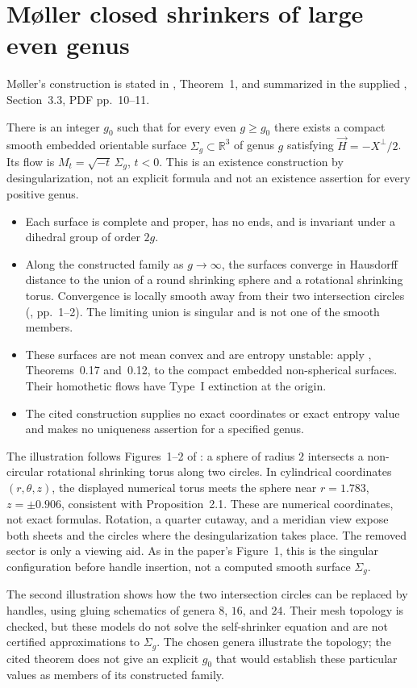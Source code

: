 \chapter{Møller closed shrinkers of large even genus}\label{sec:catalogue-moller-genus}
M{\o}ller's construction is stated in \cite{CatMoller2014}, Theorem~1,
and summarized in the supplied \cite{CatDLN2018}, Section~3.3,
PDF pp.~10--11.

\begin{example}\label{ex:catalogue-moller-genus}
There is an integer $g_0$ such that for every even $g\geq g_0$ there
exists a compact smooth embedded orientable surface
$\Sigma_g\subset\mathbb R^3$ of genus $g$ satisfying
$\vec H=-X^\perp/2$. Its flow is
$M_t=\sqrt{-t}\,\Sigma_g$, $t<0$.
This is an existence construction by desingularization, not an explicit
formula and not an existence assertion for every positive genus.
\begin{itemize}
\item Each surface is complete and proper, has no ends, and is invariant
under a dihedral group of order $2g$.
\item Along the constructed family as $g\to\infty$, the surfaces
converge in Hausdorff distance to the union of a round shrinking sphere
and a rotational shrinking torus. Convergence is locally smooth away
from their two intersection circles (\cite{CatMoller2014}, pp.~1--2).
The limiting union is singular and is not one of the smooth members.
\item These surfaces are not mean convex and are entropy unstable:
apply \cite{CM12}, Theorems~0.17 and~0.12, to the compact
embedded non-spherical surfaces. Their homothetic flows have Type~I
extinction at the origin.
\item The cited construction supplies no exact coordinates or exact
entropy value and makes no uniqueness assertion for a specified genus.
\end{itemize}
The illustration follows Figures~1--2 of \cite{CatMoller2014}: a sphere
of radius $2$ intersects a non-circular rotational shrinking torus along
two circles. In cylindrical coordinates $(r,\theta,z)$, the displayed
numerical torus meets the sphere near $r=1.783$, $z=\pm0.906$,
consistent with Proposition~2.1. These are numerical coordinates, not
exact formulas. Rotation, a quarter cutaway, and a meridian view expose
both sheets and the circles where the desingularization takes place.
The removed sector is only a viewing aid. As in the paper's Figure~1,
this is the singular configuration before handle insertion, not a
computed smooth surface $\Sigma_g$.

The second illustration shows how the two intersection circles can be
replaced by handles, using gluing schematics of genera $8$, $16$, and $24$.
Their mesh topology is checked, but these models do not solve the
self-shrinker equation and are not certified approximations to
$\Sigma_g$. The chosen genera illustrate the topology; the cited theorem
does not give an explicit $g_0$ that would establish these particular
values as members of its constructed family.
\end{example}

